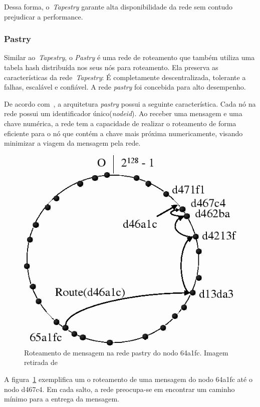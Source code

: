 Dessa forma, o~\emph{Tapestry} garante alta disponibilidade da rede sem contudo prejudicar a performance.

\subsubsection{Pastry}

Similar ao~\emph{Tapestry}, o \emph{Pastry} é uma rede de roteamento que também utiliza uma tabela hash distribuída nos seus nós para roteamento. Ela preserva as características da rede~\emph{Tapestry}: É completamente descentralizada, tolerante a falhas, escalável e confiável. A rede \emph{pastry} foi concebida para alto desempenho.

De acordo com~\cite{rowstron01}, a arquitetura \emph{pastry} possui a seguinte característica. Cada nó na rede possui um identificador único(\emph{nodeid}). Ao receber uma mensagem e uma chave numérica, a rede tem a capacidade de realizar o roteamento de forma eficiente para o nó que contém a chave mais próxima numericamente, visando minimizar a viagem da mensagem pela rede.

\begin{figure}
	\centering
	\includegraphics[scale=0.5]{images/roteamento-pastry.png}
	\caption{Roteamento de mensagem na rede pastry do nodo 64a1fc. Imagem retirada de~\cite{rowstron01}}
	\label{fig:roteamento-pastry}
\end{figure}

A figura~\ref{fig:roteamento-pastry} exemplifica um o roteamento de uma mensagem do nodo 64a1fc até o nodo d467c4. Em cada salto, a rede preocupa-se em encontrar um caminho mínimo para a entrega da mensagem.

